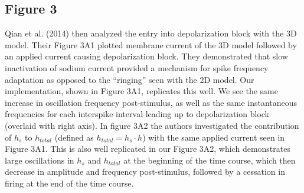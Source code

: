 \subsection{Figure 3}
Qian et al. (2014) then analyzed the entry into depolarization block with the 3D model. Their Figure 3A1 plotted membrane current of the 3D model followed by an applied current causing depolarization block. They demonstrated that slow inactivation of sodium current provided a mechanism for spike frequency adaptation as opposed to the ``ringing'' seen with the 2D model. Our implementation, shown in Figure 3A1, replicates this well. We see the same increase in oscillation frequency post-stimulus, as well as the same instantaneous frequencies for each interspike interval leading up to depolarization block (overlaid with right axis). In figure 3A2 the authors investigated the contribution of $h_s$ to $h_{total}$ (defined as $h_{total}= h_{s}\cdot h$) with the same applied current seen in Figure 3A1. This is also well replicated in our Figure 3A2, which demonstrates large oscillations in $h_s$ and $h_{total}$ at the beginning of the time course, which then decrease in amplitude and frequency post-stimulus, followed by a cessation in firing at the end of the time course.

